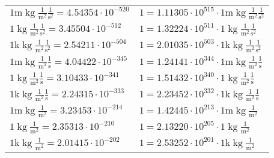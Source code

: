 \begin{center}
\begin{longtable}{l l}
{\color{gray}$1 \bm{\mathrm{ m}}\operatorname{kg}\frac1{\operatorname{m}^2}\frac1{\operatorname{s}^2}{}{} = 4.54354\cdot10^{-520} $}   & {\color{gray}$ 1 = 1.11305\cdot10^{515} \cdot 1 \bm{\mathrm{ m}}\operatorname{kg}\frac1{\operatorname{m}^2}\frac1{\operatorname{s}^2}{}{}$}  \\
{\color{black}$1 \bm{\mathrm{ }}\operatorname{kg}\frac1{\operatorname{m}^2}\frac1{\operatorname{s}^2}{}{} = 3.45504\cdot10^{-512} $}   & {\color{black}$ 1 = 1.32224\cdot10^{511} \cdot 1 \bm{\mathrm{ }}\operatorname{kg}\frac1{\operatorname{m}^2}\frac1{\operatorname{s}^2}{}{}$}  \\
{\color{gray}$1 \bm{\mathrm{ k}}\operatorname{kg}\frac1{\operatorname{m}^2}\frac1{\operatorname{s}^2}{}{} = 2.54211\cdot10^{-504} $}   & {\color{gray}$ 1 = 2.01035\cdot10^{503} \cdot 1 \bm{\mathrm{ k}}\operatorname{kg}\frac1{\operatorname{m}^2}\frac1{\operatorname{s}^2}{}{}$}  \\
{\color{gray}$1 \bm{\mathrm{ m}}\operatorname{kg}\frac1{\operatorname{m}^2}\frac1{\operatorname{s}}{}{} = 4.04422\cdot10^{-345} $}   & {\color{gray}$ 1 = 1.24141\cdot10^{344} \cdot 1 \bm{\mathrm{ m}}\operatorname{kg}\frac1{\operatorname{m}^2}\frac1{\operatorname{s}}{}{}$}  \\
{\color{black}$1 \bm{\mathrm{ }}\operatorname{kg}\frac1{\operatorname{m}^2}\frac1{\operatorname{s}}{}{} = 3.10433\cdot10^{-341} $}   & {\color{black}$ 1 = 1.51432\cdot10^{340} \cdot 1 \bm{\mathrm{ }}\operatorname{kg}\frac1{\operatorname{m}^2}\frac1{\operatorname{s}}{}{}$}  \\
{\color{gray}$1 \bm{\mathrm{ k}}\operatorname{kg}\frac1{\operatorname{m}^2}\frac1{\operatorname{s}}{}{} = 2.24315\cdot10^{-333} $}   & {\color{gray}$ 1 = 2.23452\cdot10^{332} \cdot 1 \bm{\mathrm{ k}}\operatorname{kg}\frac1{\operatorname{m}^2}\frac1{\operatorname{s}}{}{}$}  \\
{\color{gray}$1 \bm{\mathrm{ m}}\operatorname{kg}\frac1{\operatorname{m}^2}{}{}{} = 3.23453\cdot10^{-214} $}   & {\color{gray}$ 1 = 1.42445\cdot10^{213} \cdot 1 \bm{\mathrm{ m}}\operatorname{kg}\frac1{\operatorname{m}^2}{}{}{}$}  \\
{\color{black}$1 \bm{\mathrm{ }}\operatorname{kg}\frac1{\operatorname{m}^2}{}{}{} = 2.35313\cdot10^{-210} $}   & {\color{black}$ 1 = 2.13220\cdot10^{205} \cdot 1 \bm{\mathrm{ }}\operatorname{kg}\frac1{\operatorname{m}^2}{}{}{}$}  \\
{\color{gray}$1 \bm{\mathrm{ k}}\operatorname{kg}\frac1{\operatorname{m}^2}{}{}{} = 2.01415\cdot10^{-202} $}   & {\color{gray}$ 1 = 2.53252\cdot10^{201} \cdot 1 \bm{\mathrm{ k}}\operatorname{kg}\frac1{\operatorname{m}^2}{}{}{}$}  \\

\end{longtable}
\end{center}
